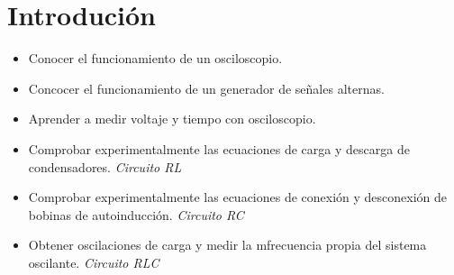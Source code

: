 \documentclass[]{article}
\begin{document}
\section{Introdución}

\begin{itemize}
      \item Conocer el funcionamiento de un osciloscopio.
      \item Concocer el funcionamiento de un generador de señales alternas.
      \item Aprender a medir voltaje y tiempo con osciloscopio.
      \item Comprobar experimentalmente las ecuaciones de carga y descarga de condensadores. \textit{Circuito RL}
      \item Comprobar experimentalmente las ecuaciones de conexión y desconexión de bobinas de autoinducción. \textit{Circuito RC}
      \item Obtener oscilaciones de carga y medir la mfrecuencia propia del sistema oscilante. \textit{Circuito RLC}
\end{itemize}



\end{document}
